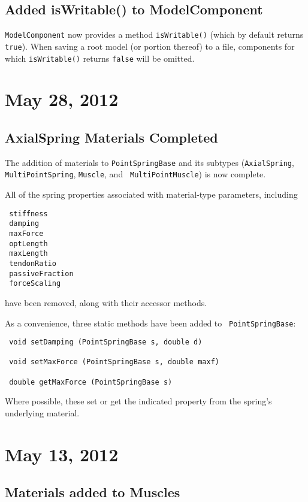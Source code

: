 \documentclass{article}
\begin{document}
\subsection*{Added isWritable() to ModelComponent}

{\tt ModelComponent} now provides a method {\tt isWritable()} (which
by default returns {\tt true}). When saving a root model (or portion
thereof) to a file, components for which {\tt isWritable()} returns
{\tt false} will be omitted.

\section*{May 28, 2012}

\subsection*{AxialSpring Materials Completed}

The addition of materials to {\tt PointSpringBase} and its subtypes
({\tt AxialSpring}, {\tt MultiPointSpring}, {\tt Muscle}, and {\tt
MultiPointMuscle}) is now complete.

All of the spring properties associated with material-type
parameters, including
\begin{lstlisting}
 stiffness
 damping
 maxForce
 optLength
 maxLength
 tendonRatio
 passiveFraction
 forceScaling
\end{lstlisting}
have been removed, along with their accessor methods.

As a convenience, three static methods have been added to {\tt
PointSpringBase}:
\begin{lstlisting}
 void setDamping (PointSpringBase s, double d)

 void setMaxForce (PointSpringBase s, double maxf)

 double getMaxForce (PointSpringBase s)
\end{lstlisting}
Where possible, these set or get the indicated property from
the spring's underlying material.

\section*{May 13, 2012}

\subsection*{Materials added to Muscles}
\end{document}

